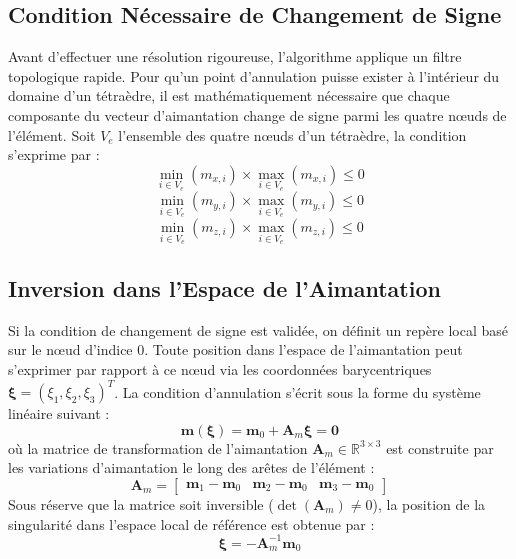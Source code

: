 \documentclass[11pt,a4paper]{article}
\begin{document}
\subsection{Condition Nécessaire de Changement de Signe}
Avant d'effectuer une résolution rigoureuse, l'algorithme applique un filtre topologique rapide. Pour qu'un point d'annulation puisse exister à l'intérieur du domaine d'un tétraèdre, il est mathématiquement nécessaire que chaque composante du vecteur d'aimantation change de signe parmi les quatre nœuds de l'élément. Soit $V_e$ l'ensemble des quatre nœuds d'un tétraèdre, la condition s'exprime par :
\begin{equation}
\min_{i \in V_e}(m_{x,i}) \times \max_{i \in V_e}(m_{x,i}) \le 0
\end{equation}
\begin{equation}
\min_{i \in V_e}(m_{y,i}) \times \max_{i \in V_e}(m_{y,i}) \le 0
\end{equation}
\begin{equation}
\min_{i \in V_e}(m_{z,i}) \times \max_{i \in V_e}(m_{z,i}) \le 0
\end{equation}

\subsection{Inversion dans l'Espace de l'Aimantation}
Si la condition de changement de signe est validée, on définit un repère local basé sur le nœud d'indice 0. Toute position dans l'espace de l'aimantation peut s'exprimer par rapport à ce nœud via les coordonnées barycentriques $\boldsymbol{\xi} = (\xi_1, \xi_2, \xi_3)^T$. La condition d'annulation s'écrit sous la forme du système linéaire suivant :
\begin{equation}
\mathbf{m}(\boldsymbol{\xi}) = \mathbf{m}_0 + \mathbf{A}_m \boldsymbol{\xi} = \mathbf{0}
\end{equation}
où la matrice de transformation de l'aimantation $\mathbf{A}_m \in \mathbb{R}^{3 \times 3}$ est construite par les variations d'aimantation le long des arêtes de l'élément :
\begin{equation}
\mathbf{A}_m = \begin{bmatrix} \mathbf{m}_1 - \mathbf{m}_0 & \mathbf{m}_2 - \mathbf{m}_0 & \mathbf{m}_3 - \mathbf{m}_0 \end{bmatrix}
\end{equation}
Sous réserve que la matrice soit inversible ($\det(\mathbf{A}_m) \neq 0$), la position de la singularité dans l'espace local de référence est obtenue par :
\begin{equation}
\boldsymbol{\xi} = - \mathbf{A}_m^{-1} \mathbf{m}_0
\end{equation}
\end{document}
